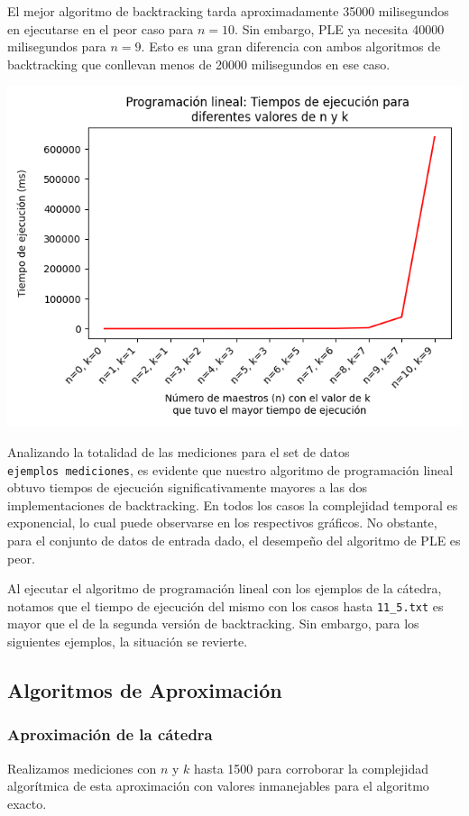\documentclass{article}
\begin{document}
El mejor algoritmo de backtracking tarda aproximadamente 35000 milisegundos en ejecutarse en el peor caso para $n = 10$. Sin embargo, PLE ya necesita 40000 milisegundos para $n = 9$. Esto es una gran diferencia con ambos algoritmos de backtracking que conllevan menos de 20000 milisegundos en ese caso.

\includegraphics[scale=0.60]{images/graficoProgramacionLineal.png}

Analizando la totalidad de las mediciones para el set de datos \texttt{ejemplos\
 mediciones}, es evidente que nuestro algoritmo de programación lineal obtuvo tiempos de ejecución significativamente mayores a las dos implementaciones de backtracking. En todos los casos la complejidad temporal es exponencial, lo cual puede observarse en los respectivos gráficos. No obstante, para el conjunto de datos de entrada dado, el desempeño del algoritmo de PLE es peor.

Al ejecutar el algoritmo de programación lineal con los ejemplos de la cátedra, notamos que el tiempo de ejecución del mismo con los casos hasta \texttt{11\_5.txt} es mayor que el de la segunda versión de backtracking. Sin embargo, para los siguientes ejemplos, la situación se revierte.

\subsection{Algoritmos de Aproximación}
\subsubsection{Aproximación de la cátedra}
Realizamos mediciones con $n$ y $k$ hasta 1500 para corroborar la complejidad algorítmica de esta aproximación con valores inmanejables para el algoritmo exacto.
\end{document}
